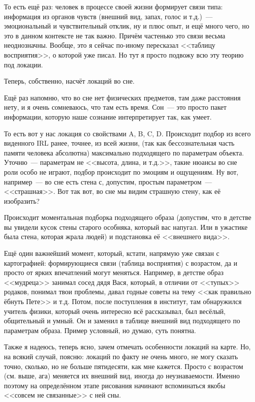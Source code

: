 \documentclass[a4paper,14pt,oneside]{memoir}
\begin{document}
То есть ещё раз: человек в процессе своей жизни формирует связи типа: информация из органов чувств (внешний вид, запах, голос и т.д.)~--- эмоциональный и чувствительный отклик, ну и плюс опыт, и ещё много чего, но это в данном контексте не так важно. Причём частенько это связи весьма неоднозначны. Вообще, это я сейчас по-иному пересказал <<таблицу восприятия>>, о которой уже писал. Но тут я просто подвожу всю эту теорию под локации.

Теперь, собственно, насчёт локаций во сне.

Ещё раз напомню, что во сне нет физических предметов, там даже расстояния нету, и я очень сомневаюсь, что там есть время. Сон~--- это просто пакет информации, которую наше сознание интерпретирует так, как умеет. 

То есть вот у нас локация со свойствами A, B, C, D. Происходит подбор из всего виденного IRL ранее, точнее, из всей жизни, (так как бессознательная часть памяти человека абсолютна) максимально подходящего по параметрам объекта. Уточню~--- параметрам не <<высота, длина, и т.д.>>, такие нюансы во сне роли особо не играют, подбор происходит по эмоциям и ощущениям. Ну вот, например~--- во сне есть стена с, допустим, простым параметром~--- <<страшная>>. Вот так вот, во сне мы видим страшную стену, как её изобразить?
 
Происходит моментальная подборка подходящего образа (допустим, что в детстве вы увидели кусок стены старого особняка, который вас напугал. Или в ужастике была стена, которая жрала людей) и подстановка её <<внешнего вида>>.
 
Ещё один важнейший момент, который, кстати, напрямую уже связан с картографией: формирующиеся связи (таблица восприятия) с возрастом, да и просто от ярких впечатлений могут меняться. Например, в детстве образ <<мудреца>> занимал сосед дядя Вася, который, в отличии от <<тупых>> родаков, понимал твои проблемы, давал годные советы на тему <<как правильно ёбнуть Пете>> и т.д. Потом, после поступления в институт, там обнаружился учитель физики, который очень интересно всё рассказывал, был весёлый, общительный и умный. Он и заменил в таблице внешний вид подходящего по параметрам образа. Пример условный, но думаю, суть понятна.
 
Также я надеюсь, теперь ясно, зачем отмечать особенности локаций на карте. Но, на всякий случай, поясню: локаций по факту не очень много, не могу сказать точно, сколько, но не больше пятидесяти, как мне кажется. Просто с возрастом (см. выше, ага) меняется их внешний вид, иногда до неузнаваемости. Именно поэтому на определённом этапе рисования начинают вспоминаться якобы <<совсем не связанные>> с ней сны.
 
\end{document}
